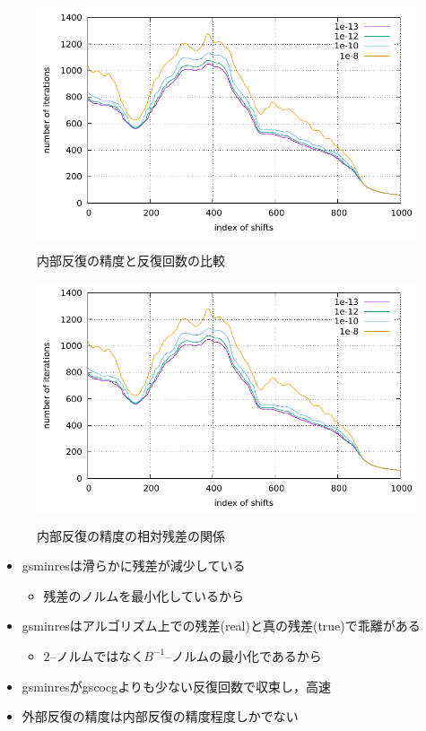 \begin{figure}[H]
	\begin{center}
		\begin{minipage}[t]{0.49\columnwidth}
			\centering
			\colorbox{white}{ \includegraphics[scale=1.5, page=1]{./fig/compare-inner.pdf} }
			\caption{内部反復の精度と反復回数の比較}
			\label{fig-compare-inner-itr}
		\end{minipage}
		\begin{minipage}[t]{0.49\columnwidth}
			\centering
			\colorbox{white}{ \includegraphics[scale=1.5, page=2]{./fig/compare-inner.pdf} }
			\caption{内部反復の精度の相対残差の関係}
			\label{fig-compare-inner-res}
		\end{minipage}
	\end{center}
\end{figure}

\begin{itemize}
	\item gsminresは滑らかに残差が減少している
		\begin{itemize}
			\item 残差のノルムを最小化しているから
		\end{itemize}
	\item gsminresはアルゴリズム上での残差(real)と真の残差(true)で乖離がある
		\begin{itemize}
			\item $2$--ノルムではなく$B^{-1}$--ノルムの最小化であるから
		\end{itemize}
	\item gsminresがgscocgよりも少ない反復回数で収束し，高速
	\item 外部反復の精度は内部反復の精度程度しかでない
\end{itemize}



